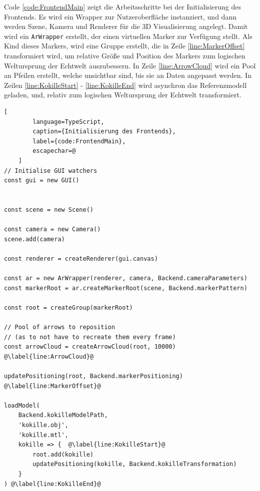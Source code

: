 Code \ref{code:FrontendMain} zeigt die Arbeitsschritte bei der
Initialisierung des Frontends. Es wird ein Wrapper zur Nutzeroberfläche
instanziert, und dann werden Szene, Kamera und Renderer für die
3D Visualisierung angelegt. Damit wird ein \texttt{ArWrapper}
erstellt, der einen virtuellen Marker zur Verfügung stellt.
Als Kind dieses Markers, wird eine Gruppe erstellt, die in Zeile
\ref{line:MarkerOffset} transformiert wird, um relative Größe und
Position des Markers zum logischen Weltursprung der Echtwelt auszubessern.
In Zeile \ref{line:ArrowCloud} wird ein Pool an Pfeilen erstellt,
welche unsichtbar sind, bis sie an Daten angepasst werden.
In Zeilen \ref{line:KokilleStart} - \ref{line:KokilleEnd} wird
asynchron das Referenzmodell geladen, und, relativ zum
logischen Weltursprung der Echtwelt transformiert.

\begin{codefloat}
	\begin{lstlisting}[
		language=TypeScript,
		caption={Initialisierung des Frontends},
		label={code:FrontendMain},
		escapechar=@
	]
// Initialise GUI watchers
const gui = new GUI()


const scene = new Scene()

const camera = new Camera()
scene.add(camera)

const renderer = createRenderer(gui.canvas)

const ar = new ArWrapper(renderer, camera, Backend.cameraParameters)
const markerRoot = ar.createMarkerRoot(scene, Backend.markerPattern)

const root = createGroup(markerRoot)

// Pool of arrows to reposition
// (as to not have to recreate them every frame)
const arrowCloud = createArrowCloud(root, 10000) @\label{line:ArrowCloud}@

updatePositioning(root, Backend.markerPositioning) @\label{line:MarkerOffset}@

loadModel(
	Backend.kokilleModelPath,
	'kokille.obj',
	'kokille.mtl',
	kokille => {  @\label{line:KokilleStart}@
		root.add(kokille)
		updatePositioning(kokille, Backend.kokilleTransformation)
	}
) @\label{line:KokilleEnd}@
	\end{lstlisting}
\end{codefloat}

